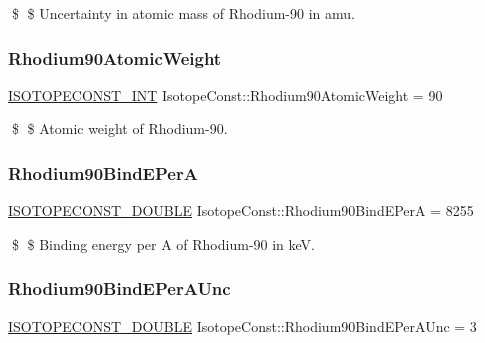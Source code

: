 \$ \$ Uncertainty in atomic mass of Rhodium-\/90 in amu. \mbox{\label{group___isotope_const-_rhodium-_rh90_ga1fbddc979637fa0a988e989f5730b247}} 
\subsubsection{\texorpdfstring{Rhodium90\+Atomic\+Weight}{Rhodium90AtomicWeight}}
{\footnotesize\ttfamily \mbox{\hyperlink{group___isotope_const-_macros_ga5f18360b3e99483a35c32d789e62621c}{I\+S\+O\+T\+O\+P\+E\+C\+O\+N\+S\+T\+\_\+\+I\+NT}} Isotope\+Const\+::\+Rhodium90\+Atomic\+Weight = 90}

\$ \$ Atomic weight of Rhodium-\/90. \mbox{\label{group___isotope_const-_rhodium-_rh90_gacd1e483e797f859ef15e0c5cef483e25}} 
\subsubsection{\texorpdfstring{Rhodium90\+Bind\+E\+PerA}{Rhodium90BindEPerA}}
{\footnotesize\ttfamily \mbox{\hyperlink{group___isotope_const-_macros_ga8f45a7272ce02c0b4c65c44636ed719a}{I\+S\+O\+T\+O\+P\+E\+C\+O\+N\+S\+T\+\_\+\+D\+O\+U\+B\+LE}} Isotope\+Const\+::\+Rhodium90\+Bind\+E\+PerA = 8255}

\$ \$ Binding energy per A of Rhodium-\/90 in keV. \mbox{\label{group___isotope_const-_rhodium-_rh90_ga91bd8f5db20772b1669cfc375897c14f}} 
\subsubsection{\texorpdfstring{Rhodium90\+Bind\+E\+Per\+A\+Unc}{Rhodium90BindEPerAUnc}}
{\footnotesize\ttfamily \mbox{\hyperlink{group___isotope_const-_macros_ga8f45a7272ce02c0b4c65c44636ed719a}{I\+S\+O\+T\+O\+P\+E\+C\+O\+N\+S\+T\+\_\+\+D\+O\+U\+B\+LE}} Isotope\+Const\+::\+Rhodium90\+Bind\+E\+Per\+A\+Unc = 3}

